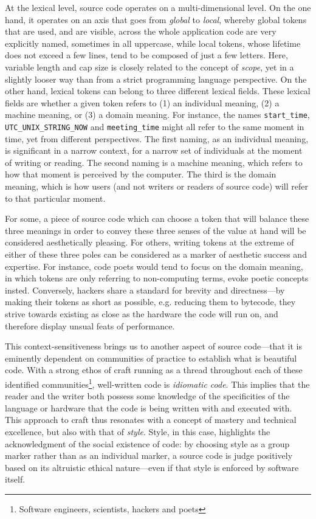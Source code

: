 At the lexical level, source code operates on a multi-dimensional level. On the one hand, it operates on an axis that goes from \emph{global} to \emph{local}, whereby global tokens that are used, and are visible, across the whole application code are very explicitly named, sometimes in all uppercase, while local tokens, whose lifetime does not exceed a few lines, tend to be composed of just a few letters. Here, variable length and cap size is closely related to the concept of \emph{scope}, yet in a slightly looser way than from a strict programming language perspective. On the other hand, lexical tokens can belong to three different lexical fields. These lexical fields are whether a given token refers to (1) an individual meaning, (2) a machine meaning, or (3) a domain meaning. For instance, the names \lstinline{start_time}, \lstinline{UTC_UNIX_STRING_NOW} and \lstinline{meeting_time} might all refer to the same moment in time, yet from different perspectives. The first naming, as an individual meaning, is significant in a narrow context, for a narrow set of individuals at the moment of writing or reading. The second naming is a machine meaning, which refers to how that moment is perceived by the computer. The third is the domain meaning, which is how users (and not writers or readers of source code) will refer to that particular moment.

For some, a piece of source code which can choose a token that will balance these three meanings in order to convey these three senses of the value at hand will be considered aesthetically pleasing. For others, writing tokens at the extreme of either of these three poles can be considered as a marker of aesthetic success and expertise. For instance, code poets would tend to focus on the domain meaning, in which tokens are only referring to non-computing terms, evoke poetic concepts insted. Conversely, hackers share a standard for brevity and directness—by making their tokens as short as possible, e.g. reducing them to bytecode, they strive towards existing as close as the hardware the code will run on, and therefore display unsual feats of performance.

This context-sensitiveness brings us to another aspect of source code—that it is eminently dependent on communities of practice to establish what is beautiful code. With a strong ethos of craft running as a thread throughout each of these identified communities\footnote{Software engineers, scientists, hackers and poets}, well-written code is \emph{idiomatic code}. This implies that the reader and the writer both possess some knowledge of the specificities of the language or hardware that the code is being written with and executed with. This approach to craft thus resonates with a concept of mastery and technical excellence, but also with that of \emph{style}. Style, in this case, highlights the acknowledgment of the social existence of code: by choosing style as a group marker rather than as an individual marker, a source code is judge positively based on its altruistic ethical nature—even if that style is enforced by software itself.

